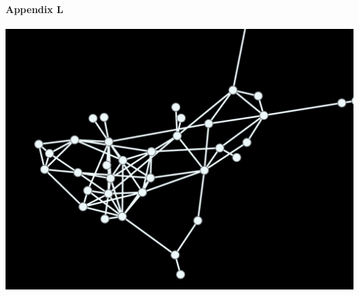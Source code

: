 \documentclass[11pt,twocolumn]{article}
\begin{document}
\paragraph{{\newline\newline\newline\newline}Appendix L\newline\newline\newline\newline\newline}
\includegraphics[scale=0.21]{eigenvectorcentraility_com.png}
\end{document}
